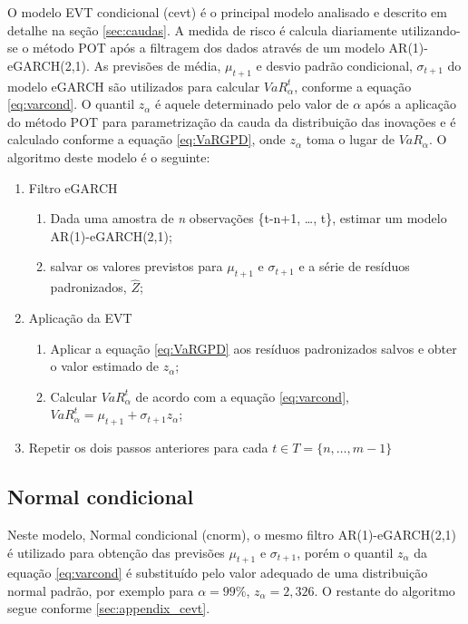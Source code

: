 \documentclass[1p]{elsarticle}
\theoremstyle{definition}
\begin{document}
O modelo EVT condicional (cevt) é o principal modelo analisado e descrito em detalhe na seção \ref{sec:caudas}. A medida de risco é calcula diariamente utilizando-se o método POT após a filtragem dos dados através de um modelo AR(1)-eGARCH(2,1). As previsões de média, $\mu_{t+1}$ e desvio padrão condicional, $\sigma_{t+1}$ do modelo eGARCH são utilizados para calcular $VaR^t_\alpha$, conforme a equação \ref{eq:varcond}. O quantil $z_\alpha$ é aquele determinado pelo valor de $\alpha$ após a aplicação do método POT para parametrização da cauda da distribuição das inovações e é calculado conforme a equação \eqref{eq:VaRGPD}, onde $z_\alpha$ toma o lugar de $VaR_\alpha$. O algoritmo deste modelo é o seguinte:

\begin{enumerate}
	\item Filtro eGARCH
	\begin{enumerate}[label*=\arabic*.]
		\item Dada uma amostra de \emph{n} observações \{t-n+1, \ldots, t\}, estimar um modelo AR(1)-eGARCH(2,1);
		\item salvar os valores previstos para $\mu_{t+1}$ e $\sigma_{t+1}$ e a série de resíduos padronizados, $\hat{Z}$;
	\end{enumerate}

	\item Aplicação da EVT
	\begin{enumerate}[label*=\arabic*.]
		\item Aplicar a equação \eqref{eq:VaRGPD} aos resíduos padronizados salvos e obter o valor estimado de $z_\alpha$;
		\item Calcular $VaR^t_\alpha$ de acordo com a equação \eqref{eq:varcond}, $VaR_\alpha^t=\mu_{t+1}+\sigma_{t+1}z_\alpha$;
	\end{enumerate}
	\item Repetir os dois passos anteriores para cada $t \in T = \{n, \ldots, m-1\}$
\end{enumerate}

\subsection{Normal condicional}

Neste modelo, Normal condicional (cnorm), o mesmo filtro AR(1)-eGARCH(2,1) é utilizado para obtenção das previsões $\mu_{t+1}$ e $\sigma_{t+1}$, porém o quantil $z_\alpha$ da equação \ref{eq:varcond} é substituído pelo valor adequado de uma distribuição normal padrão, por exemplo para $\alpha = 99\%$, $z_\alpha = 2,326$. O restante do algoritmo segue conforme \ref{sec:appendix_cevt}.
\end{document}
